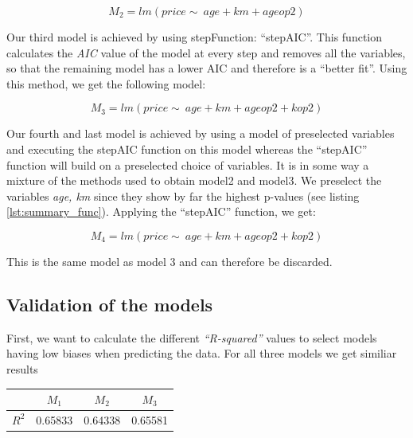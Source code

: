 \begin{equation}\label{eq:model2}
	M_2 = lm(price \sim\ age + km + ageop2)
\end{equation}

Our third model is achieved by using stepFunction: ``stepAIC''. 
This function calculates the \emph{AIC} value of the model at every step and 
removes all the variables, so that the remaining model has a lower AIC and  
therefore is a ``better fit''.
Using this method, we get the following model:

\begin{equation}\label{eq:model3}
	M_3 = lm(price \sim\ age + km + ageop2 + kop2)
\end{equation}

Our fourth and last model is achieved by using a model of preselected 
variables and executing the stepAIC function on this model whereas the 
``stepAIC'' function will build on a preselected choice of variables.
It is in some way a mixture of the methods used to obtain model2 and model3. 
We preselect the variables \emph{age, km} since they show by far the highest p-values (see listing \ref{lst:summary_func}). Applying the ``stepAIC'' function, we get: 

\begin{equation}\label{eq:model4}
	M_4 = lm(price \sim\ age + km + ageop2 + kop2)
\end{equation} 

This is the same model as model 3 and can therefore be discarded.

\subsection{Validation of the models} %
\label{sub:validation_of_the_models}

First, we want to calculate the different \emph{``R-squared''} values to select models having low biases when predicting the data. 
For all three models we get similiar results

\begin{table}[ht]
\begin{center}
\begin{tabular}{ |c|c|c|c| } 
 \hline
 & $M_1$ & $M_2$ & $M_3$ \\ 
 \hline
 $R^2$ &  0.65833 & 0.64338 & 0.65581 \\ 
 \hline
\end{tabular}
\end{center}
\end{table}


